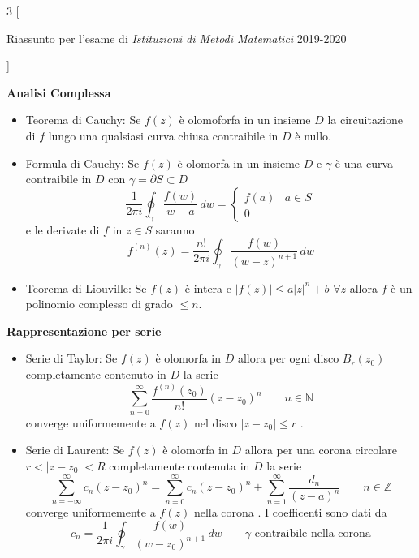 \documentclass[10pt,a4paper]{report}
\begin{document}
\small
\begin{multicols*}{3}
[
	\begin{center} Riassunto per l'esame di \textit{Istituzioni di Metodi Matematici} 2019-2020\end{center}
]
\begin{center}

\textbf{\large Analisi Complessa}\par
	\begin{itemize}[label=$\cdot$]
		\item Teorema di Cauchy: Se $f(z)$ è olomoforfa in un insieme $D$ la circuitazione di $f$ lungo una qualsiasi curva chiusa contraibile in $D$ è nullo.
		\item Formula di Cauchy: Se $f(z)$ è olomorfa in un insieme $D$ e $\gamma$ è una curva contraibile in $D$ con $\gamma=\partial S\subset D$ 
		\[
		\dfrac{1}{2\pi i}\oint_\gamma \dfrac{f(w)}{w-a}\,dw =\begin{cases} f(a) & a\in S \\ 0 \end{cases}
		\]
		e le derivate di $f$ in $z\in S$ saranno 
		\[
		f^{(n)}(z)=\dfrac{n!}{2\pi i} \oint_\gamma \dfrac{f(w)}{(w-z)^{n+1}}\,dw
		\]
		\item Teorema di Liouville: Se $f(z)$ è intera e $\left|f(z)\right|\leq a|z|^n+b$ $\forall z$ allora $f$ è un polinomio complesso di grado $\leq n$.
	\end{itemize}
\textbf{Rappresentazione per serie} \par
	\begin{itemize}[label=$\cdot$]
		\item Serie di Taylor: Se $f(z)$ è olomorfa in $D$ allora per ogni disco $B_{r}(z_0)$ completamente contenuto in $D$ la serie 
		\[
		\sum_{n=0}^\infty \dfrac{f^{(n)}(z_0)}{n!}(z-z_0)^n \qquad n\in\mathbb{N}
		\]
		converge uniformemente a $f(z)$ nel disco $|z-z_0|\leq r$ .
		\item Serie di Laurent: Se $f(z)$ è olomorfa in $D$ allora per una corona circolare $r<|z-z_0|<R$  completamente contenuta in $D$ la serie
		\[
		\sum_{n=-\infty}^{\infty} c_n (z-z_0)^n=\sum_{n=0}^\infty c_n (z-z_0)^n +\sum_{n=1}^\infty \dfrac{d_n}{(z-a)^n} \qquad n\in\mathbb{Z}
		\]
		converge uniformemente a $f(z)$ nella corona . I coefficenti sono dati da 
		\[
		c_n=\dfrac{1}{2\pi i} \oint_\gamma \dfrac{f(w)}{(w-z_0)^{n+1}}\,dw \qquad \gamma\text{ contraibile nella corona} 
\]
\end{itemize}
\end{center}
\end{multicols*}
\end{document}
